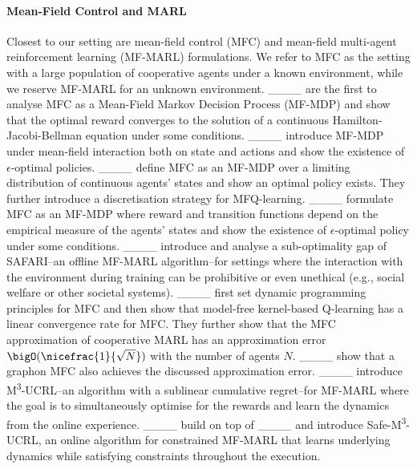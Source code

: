 \paragraph{Mean-Field Control and MARL}
Closest to our setting are mean-field control (MFC) and mean-field multi-agent reinforcement learning (MF-MARL) formulations. We refer to MFC as the setting with a large population of cooperative agents under a known environment, while we reserve MF-MARL for an unknown environment.
____ are the first to analyse MFC as a Mean-Field Markov Decision Process (MF-MDP) and show that the optimal reward converges to the solution of a continuous Hamilton-Jacobi-Bellman equation under some conditions.
____ introduce MF-MDP under mean-field interaction both on state and actions and show the existence of $\epsilon$-optimal policies. 
____ define MFC as an MF-MDP  over a limiting distribution of continuous agents' states and show an optimal policy exists. They further introduce a discretisation strategy for MFQ-learning.  
____ formulate MFC as an MF-MDP where reward and transition functions depend on the empirical measure of the agents' states and show the existence of $\epsilon$-optimal policy under some conditions. 
____ introduce and analyse a sub-optimality gap of SAFARI--an offline MF-MARL algorithm--for settings where the interaction with the environment during training can be prohibitive or even unethical (e.g., social welfare or other societal systems).
____ first set dynamic programming principles for MFC and then show that model-free kernel-based Q-learning has a linear convergence rate for MFC. They further show that the MFC approximation of cooperative MARL has an approximation error $\bigO(\nicefrac{1}{\sqrt{N}})$ with the number of agents $N$. ____ show that a graphon MFC also achieves the discussed approximation error. 
____ introduce M\textsuperscript{3}-UCRL--an algorithm with a sublinear cumulative regret--for MF-MARL where the goal is to simultaneously optimise for the rewards and learn the dynamics from the online experience.
____ build on top of ____ and introduce Safe-M\textsuperscript{3}-UCRL, an online algorithm for constrained MF-MARL that learns underlying dynamics while satisfying constraints throughout the execution. 